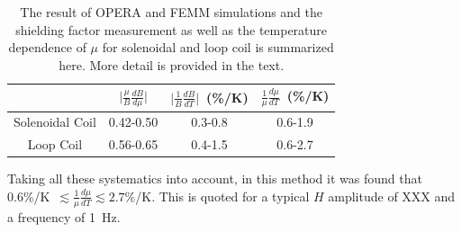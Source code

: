 \begin{table}
\begin{tabular}{|c|c|c|c|}
\hline 
  & $\vert \frac{\mu}{B}\frac{dB}{d\mu}\vert$ & $\vert \frac{1}{B} \frac{dB}{dT}\vert$~(\%/K) & $\frac{1}{\mu}\frac{d\mu}{dT}$~(\%/K) \\ 
\hline 
Solenoidal Coil & 0.42-0.50 & 0.3-0.8 & 0.6-1.9 \\ 
\hline 
Loop Coil & 0.56-0.65 & 0.4-1.5 & 0.6-2.7 \\ 
\hline 
\end{tabular} 
\caption{The result of OPERA and FEMM simulations and the shielding factor measurement as well as the temperature dependence of $\mu$ for solenoidal and loop coil is summarized here. More detail is provided in the text.}
\label{tab:axialsummary}

\end{table}


Taking all these systematics into account, in this method it was found
that 0.6\%/K~$\lesssim\frac{1}{\mu}\frac{d\mu}{dT}\lesssim 2.7\%$/K.
This is quoted for a typical $H$ amplitude of XXX and a frequency of
1~Hz.




